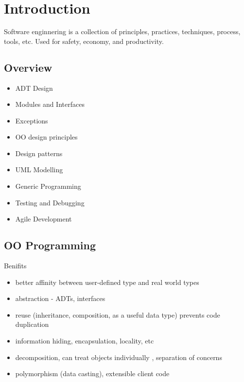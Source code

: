 \documentclass[12pt]{article}
\begin{document}
\section*{Introduction}
Software enginnering is a collection of principles, practices, techniques, process, tools, etc. Used for safety, economy, and productivity.

\subsection*{Overview}
\begin{itemize}
\item ADT Design
\item Modules and Interfaces
\item Exceptions
\item OO design principles
\item Design patterns
\item UML Modelling
\item Generic Programming
\item Testing and Debugging
\item Agile Development
\end{itemize}

\subsection*{OO Programming}
Benifits
\begin{itemize}
\item better affinity between user-defined type and real world types
\item abstraction - ADTs, interfaces
\item reuse (inheritance, composition, as a useful data type) prevents code duplication
\item information hiding, encapsulation, locality, etc
\item decomposition, can treat objects individually , separation of concerns
\item polymorphism (data casting), extensible client code
\end{itemize}
\end{document}
